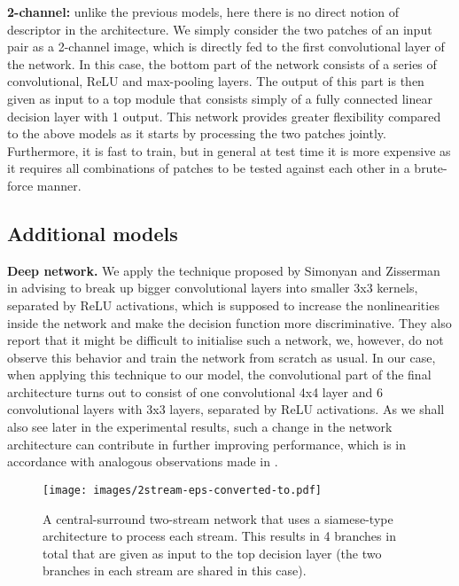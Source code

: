 \documentclass[10pt,twocolumn,letterpaper]{article}
\newcommand*{\USEIMAGES}{}
\begin{document}
\textbf{2-channel:} unlike the previous models, here there is no direct notion of descriptor in the  architecture. We simply consider the two patches of  an input pair as a 2-channel image, which is directly fed to the first convolutional layer of the network. In this case, the bottom part of the network  consists of  a series of convolutional, ReLU and max-pooling layers. The output of this part is then given as input to a top module that  consists simply of a fully connected linear decision layer with 1 output.
%
%
%
%
%
%
%
This network provides greater flexibility compared to the above models as it starts by processing the two patches jointly. Furthermore, it is fast to train, but in general at test time it is more expensive as it requires all 
combinations of patches to be tested against each other in a brute-force manner.
%

\subsection{Additional models}\label{sec:extra_models}
\textbf{Deep network.} We apply the technique proposed by Simonyan and Zisserman 
in \cite{verydeep}  advising to break up bigger convolutional layers into smaller 3x3 kernels, 
separated by ReLU activations, which is supposed to increase the nonlinearities inside the network and  make the decision function more  discriminative. 
%
They also report that it might be difficult to initialise such a network, we, however, do not 
observe this behavior and train the network from scratch as usual. In our case,  when applying this technique to our model, the convolutional part of the final architecture turns out to consist of one
convolutional 4x4 layer and 6 convolutional layers with 3x3 layers, separated by ReLU
activations. As we shall also see later in the experimental results, such a change in the network architecture can contribute in further improving performance, which is in accordance with analogous observations made in \cite{verydeep}.
%


\ifdefined\USEIMAGES
\begin{figure}
\small
\begin{center}
\texttt{[image: images/2stream-eps-converted-to.pdf]}
%
\end{center}
\vspace{-8pt}
\caption{A central-surround two-stream network that uses a siamese-type architecture to process each stream. This results in 4 branches in total that are given as input to the top decision layer (the two branches in each stream are shared in this case).}
\vspace{-12pt}
\small
\label{fig:2stream}
\end{figure}
\fi
\end{document}
